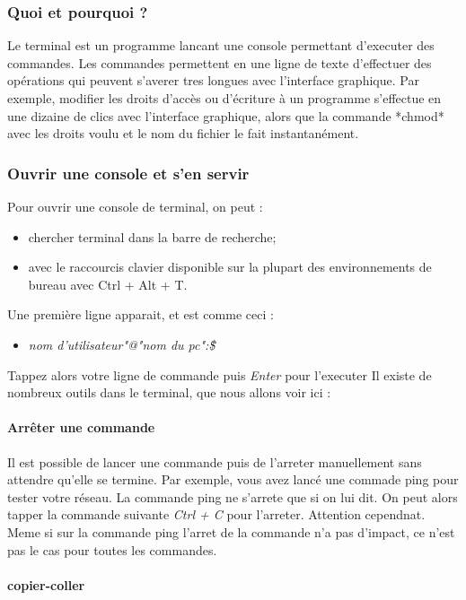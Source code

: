 \subsubsection{Quoi et pourquoi ?}
Le terminal est un programme lancant une console permettant d'executer des commandes. Les commandes permettent en une ligne de texte d'effectuer des opérations qui peuvent s'averer tres longues avec l'interface graphique. Par exemple, modifier les droits d'accès ou d'écriture à un programme s'effectue en une dizaine de clics avec l'interface graphique, alors que la commande *chmod* avec les droits voulu et le nom du fichier le fait instantanément. 

\subsubsection{Ouvrir une console et s'en servir}
Pour ouvrir une console de terminal, on peut :

\begin{itemize}
\item chercher terminal dans la barre de recherche;
\item avec le raccourcis clavier disponible sur la plupart des environnements de bureau avec Ctrl + Alt + T.
\end{itemize}

Une première ligne apparait, et est comme ceci :

\begin{itemize}
\item \textit{nom d'utilisateur"@"nom du pc":\~\$}
\end{itemize}

Tappez alors votre ligne de commande puis \textit{Enter} pour l'executer
Il existe de nombreux outils dans le terminal, que nous allons voir ici :
\paragraph{Arrêter une commande}

Il est possible de lancer une commande puis de l'arreter manuellement sans attendre qu'elle se termine. Par exemple, vous avez lancé une commade ping pour tester votre réseau. La commande ping ne s'arrete que si on lui dit. On peut alors tapper la commande suivante \textit{Ctrl + C} pour l'arreter. Attention cependnat. Meme si sur la commande ping l'arret de la commande n'a pas d'impact, ce n'est pas le cas pour toutes les commandes.

\paragraph{copier-coller}

